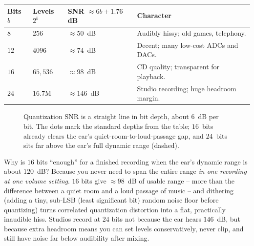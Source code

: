 \begin{center}
\begin{tabular}{@{}lll p{6.6cm}@{}}
\toprule
Bits $b$ & Levels $2^b$ & SNR $\approx 6b{+}1.76$ dB & Character \\
\midrule
$8$  & $256$        & $\approx 50$~dB  & Audibly hissy; old games, telephony.\\
$12$ & $4096$       & $\approx 74$~dB  & Decent; many low-cost ADCs and DACs.\\
$16$ & $65{,}536$   & $\approx 98$~dB  & CD quality; transparent for playback.\\
$24$ & $16.7$M      & $\approx 146$~dB & Studio recording; huge headroom margin.\\
\bottomrule
\end{tabular}
\end{center}

\begin{figure}[H]
\centering
{}
\caption{Quantization SNR is a straight line in bit depth, about $6$~dB per bit. The dots mark the
standard depths from the table; $16$~bits already clears the ear's quiet-room-to-loud-passage gap,
and $24$~bits sits far above the ear's full dynamic range (dashed).}
\label{ch26:fig-snr}
\end{figure}

\begin{whybox}
Why is $16$ bits ``enough'' for a finished recording when the ear's dynamic range is about
$120$~dB? Because you never need to span the entire range \emph{in one recording at one volume
setting}. $16$ bits give $\approx 98$~dB of usable range -- more than the difference between a
quiet room and a loud passage of music -- and dithering (adding a tiny, sub-LSB (least significant bit) random noise floor before
quantizing) turns correlated quantization distortion into a flat, practically inaudible hiss.
Studios record at $24$ bits not because the ear hears $146$~dB, but because
extra headroom means you can set levels conservatively, never clip, and still have noise far below
audibility after mixing.
\end{whybox}

